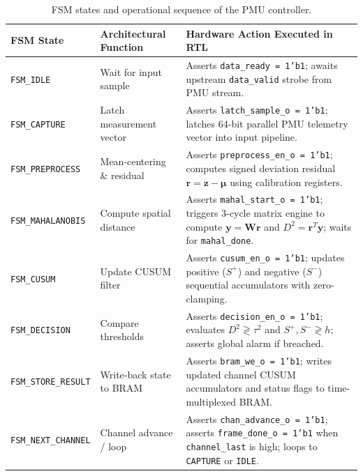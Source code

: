 \documentclass[12pt,a4paper]{report}
\begin{document}
\begin{table}[H]
\centering
\caption{FSM states and operational sequence of the PMU controller.}
\label{tab:fsm_states}
\small
\renewcommand{\arraystretch}{1.25}
\begin{tabular}{|p{3.2cm}|p{3.8cm}|p{7.4cm}|}
\hline
\textbf{FSM State} & \textbf{Architectural Function} & \textbf{Hardware Action Executed in RTL} \\
\hline
\texttt{FSM\_IDLE} & Wait for input sample & Asserts \texttt{data\_ready = 1'b1}; awaits upstream \texttt{data\_valid} strobe from PMU stream. \\
\hline
\texttt{FSM\_CAPTURE} & Latch measurement vector & Asserts \texttt{latch\_sample\_o = 1'b1}; latches 64-bit parallel PMU telemetry vector into input pipeline. \\
\hline
\texttt{FSM\_PREPROCESS} & Mean-centering \& residual & Asserts \texttt{preprocess\_en\_o = 1'b1}; computes signed deviation residual $\boldsymbol{r} = \boldsymbol{z} - \boldsymbol{\mu}$ using calibration registers. \\
\hline
\texttt{FSM\_MAHALANOBIS} & Compute spatial distance & Asserts \texttt{mahal\_start\_o = 1'b1}; triggers 3-cycle matrix engine to compute $\boldsymbol{y} = \boldsymbol{W}\boldsymbol{r}$ and $D^2 = \boldsymbol{r}^T\boldsymbol{y}$; waits for \texttt{mahal\_done}. \\
\hline
\texttt{FSM\_CUSUM} & Update CUSUM filter & Asserts \texttt{cusum\_en\_o = 1'b1}; updates positive ($S^+$) and negative ($S^-$) sequential accumulators with zero-clamping. \\
\hline
\texttt{FSM\_DECISION} & Compare thresholds & Asserts \texttt{decision\_en\_o = 1'b1}; evaluates $D^2 \gtrless \tau^2$ and $S^+, S^- \gtrless h$; asserts global alarm if breached. \\
\hline
\texttt{FSM\_STORE\_RESULT} & Write-back state to BRAM & Asserts \texttt{bram\_we\_o = 1'b1}; writes updated channel CUSUM accumulators and status flags to time-multiplexed BRAM. \\
\hline
\texttt{FSM\_NEXT\_CHANNEL} & Channel advance / loop & Asserts \texttt{chan\_advance\_o = 1'b1}; asserts \texttt{frame\_done\_o = 1'b1} when \texttt{channel\_last} is high; loops to \texttt{CAPTURE} or \texttt{IDLE}. \\
\hline
\end{tabular}
\end{table}
\end{document}

